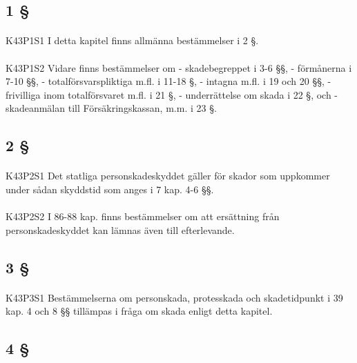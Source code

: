 \documentclass[a4paper,notitlepage,openany,10pt]{book}
\begin{document}
\subsection*{1 §}
\paragraph*{}
{\tiny K43P1S1}
I detta kapitel finns allmänna bestämmelser i 2 §.
\paragraph*{}
{\tiny K43P1S2}
Vidare finns bestämmelser om
\newline - skadebegreppet i 3-6 §§,
\newline - förmånerna i 7-10 §§,
\newline - totalförsvarspliktiga m.fl. i 11-18 §,
\newline - intagna m.fl. i 19 och 20 §§,
\newline - frivilliga inom totalförsvaret m.fl. i 21 §,
\newline - underrättelse om skada i 22 §, och
\newline - skadeanmälan till Försäkringskassan, m.m. i 23 §.
\subsection*{2 §}
\paragraph*{}
{\tiny K43P2S1}
Det statliga personskadeskyddet gäller för skador som uppkommer under sådan skyddstid som anges i 7 kap. 4-6 §§.
\paragraph*{}
{\tiny K43P2S2}
I 86-88 kap. finns bestämmelser om att ersättning från personskadeskyddet kan lämnas även till efterlevande.
\subsection*{3 §}
\paragraph*{}
{\tiny K43P3S1}
Bestämmelserna om personskada, protesskada och skadetidpunkt i 39 kap. 4 och 8 §§ tillämpas i fråga om skada enligt detta kapitel.
\subsection*{4 §}
\end{document}
